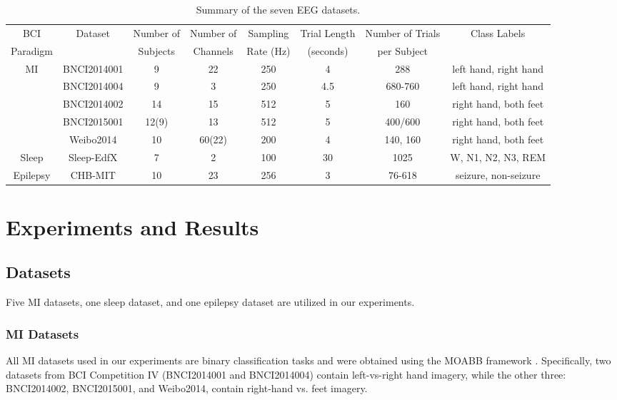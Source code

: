 \documentclass[journal,twocolumn]{IEEEtran}
\begin{document}
\begin{table}[htpb] \centering
  \caption{Summary of the seven EEG datasets.}
  \label{tab:datasets}
  \begin{tabular}{c|c|c|c|c|c|c|c}
  \toprule
  BCI&\multirow{2}{*}{Dataset} & Number of & Number of & Sampling & Trial Length & Number of Trials  & \multirow{2}{*}{Class Labels} \\
  Paradigm& & Subjects & Channels & Rate (Hz) & (seconds) & per Subject &  \\
  \midrule
  \multirow{4}{*}{MI}&BNCI2014001 & 9 & 22 & 250 & 4  & 288 &  left hand, right hand \\
  &BNCI2014004 & 9 & 3 & 250 & 4.5 & 680-760 &  left hand, right hand \\
  &BNCI2014002 & 14 & 15 & 512 & 5 & 160 &  right hand, both feet \\
  &BNCI2015001 & 12(9) & 13 & 512 & 5 & 400/600 &  right hand, both feet \\
  &Weibo2014 & 10 & 60(22) & 200 & 4 & 140, 160 &  right hand, both feet \\
  \midrule
  Sleep&Sleep-EdfX& 7 & 2 & 100 & 30 & 1025 &  W, N1, N2, N3, REM \\
  \midrule
  Epilepsy&CHB-MIT&10&23&256&3&76-618&seizure, non-seizure \\
  \bottomrule
  \end{tabular}
\end{table}


\section{Experiments and Results}\label{sec:exp}
\subsection{Datasets}
Five MI datasets, one sleep dataset, and one epilepsy dataset are utilized in our experiments.

\subsubsection{MI Datasets}
All MI datasets used in our experiments are binary classification tasks and were obtained using the MOABB framework \cite{jayaram2018moabb}. Specifically, two datasets from BCI Competition IV (BNCI2014001 and BNCI2014004) \cite{tangermann2012review} contain left-vs-right hand imagery, while the other three: BNCI2014002, BNCI2015001, and Weibo2014, contain right-hand vs. feet imagery. 
\end{document}
